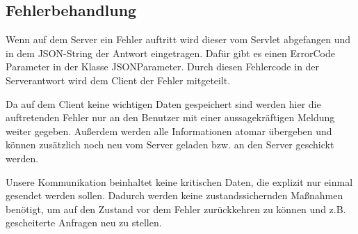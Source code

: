 \begin {center}
\end {center}

	\subsection{Fehlerbehandlung}
Wenn auf dem Server ein Fehler auftritt wird dieser vom Servlet abgefangen und in dem JSON-String der Antwort eingetragen. Dafür gibt es einen ErrorCode Parameter in der Klasse JSONParameter. Durch diesen Fehlercode in der Serverantwort wird dem Client der Fehler mitgeteilt.\par

Da auf dem Client keine wichtigen Daten gespeichert sind werden hier die auftretenden Fehler nur an den Benutzer mit einer aussagekräftigen Meldung weiter gegeben. Außerdem werden alle Informationen atomar übergeben und können zusätzlich noch neu vom Server geladen bzw. an den Server geschickt werden. \par

Unsere Kommunikation beinhaltet keine kritischen Daten, die explizit nur einmal gesendet werden sollen. Dadurch werden keine zustandssichernden Maßnahmen benötigt, um auf den Zustand vor dem Fehler zurückkehren zu können und z.B. gescheiterte Anfragen neu zu stellen.

	\newpage
